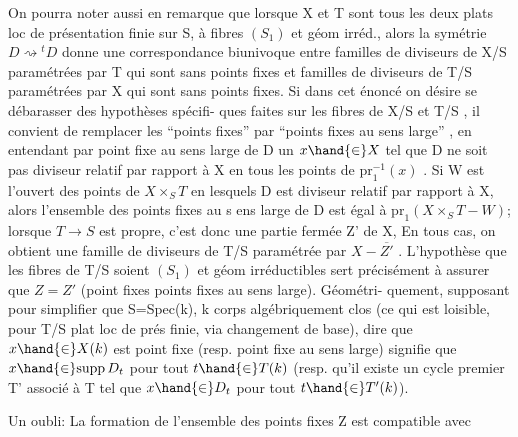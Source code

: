 
On pourra noter aussi en remarque que lorsque X et T sont tous les
deux plats loc de présentation finie sur S, à fibres $(S_1)$ et géom irréd.,
alors la symétrie $D \rightsquigarrow {}^{t}D$ donne une correspondance biunivoque entre
familles de diviseurs de X/S paramétrées par T qui sont sans points fixes
et familles de diviseurs de T/S paramétrées par X qui sont sans points
fixes. Si dans cet énoncé on désire se débarasser des hypothèses spécifi-%
ques faites sur les fibres de X/S et T/S , il convient de remplacer
les ``points fixes'' par ``points fixes au sens large'' , en entendant par
point fixe au sens large de D un $x \hand{\in} X$ tel que D ne soit pas diviseur
 relatif  par rapport à X en tous les points de $\mathrm{pr}_1^{-1}(x)$ . Si W est l'ouvert des
points de $X\times_S T$ en lesquels D est  diviseur  relatif par
rapport à X, alors l'ensemble des points fixes au s ens large de D est
 égal à $\mathrm{pr}_1(X\times_S T - W)$; lorsque $T \to S$ est propre, c'est donc
une partie fermée Z' de X,  En tous cas, on obtient une
famille de diviseurs de T/S paramétrée par $X-\overline{Z'}$ . L'hypothèse que les
fibres de T/S soient $(S_1)$ et géom irréductibles  sert précisément à
assurer que $Z=Z'$ (point fixes \unsure{$=$} points fixes au sens large). Géométri-%
quement, supposant pour simplifier que S=Spec(k), k corps algébriquement
clos (ce qui est loisible, pour T/S plat loc de prés finie, via changement de base), dire que $x \hand{\in} X(k)$
est point fixe (resp. point fixe au sens large) signifie que $x \hand{\in} \mathrm{supp}\, D_t$
pour tout $t \hand{\in} T(k)$ (resp. qu'il existe un cycle premier T' associé à T
tel que $x \hand{\in} D_t$ pour tout $t \hand{\in} T'(k)$).

 \placedmargin{$\|$} Un oubli: 
La formation de l'ensemble des points fixes Z est compatible avec

